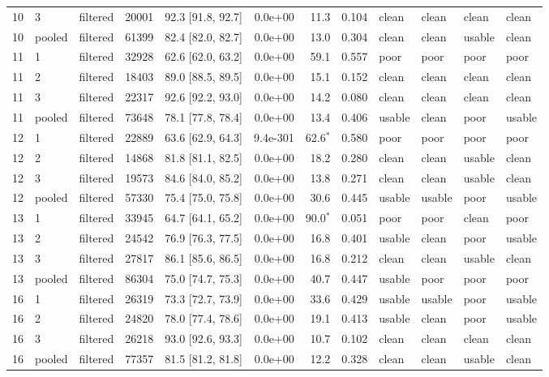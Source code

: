 \begin{longtable}{lllrrrrrllll}
10 & 3 & filtered & 20001 & 92.3 [91.8, 92.7] & 0.0e+00 & 11.3 & 0.104 & clean & clean & clean & clean \\
10 & pooled & filtered & 61399 & 82.4 [82.0, 82.7] & 0.0e+00 & 13.0 & 0.304 & clean & clean & usable & clean \\
11 & 1 & filtered & 32928 & 62.6 [62.0, 63.2] & 0.0e+00 & 59.1 & 0.557 & poor & poor & poor & poor \\
11 & 2 & filtered & 18403 & 89.0 [88.5, 89.5] & 0.0e+00 & 15.1 & 0.152 & clean & clean & clean & clean \\
11 & 3 & filtered & 22317 & 92.6 [92.2, 93.0] & 0.0e+00 & 14.2 & 0.080 & clean & clean & clean & clean \\
11 & pooled & filtered & 73648 & 78.1 [77.8, 78.4] & 0.0e+00 & 13.4 & 0.406 & usable & clean & poor & usable \\
12 & 1 & filtered & 22889 & 63.6 [62.9, 64.3] & 9.4e-301 & 62.6$^\ast$ & 0.580 & poor & poor & poor & poor \\
12 & 2 & filtered & 14868 & 81.8 [81.1, 82.5] & 0.0e+00 & 18.2 & 0.280 & clean & clean & usable & clean \\
12 & 3 & filtered & 19573 & 84.6 [84.0, 85.2] & 0.0e+00 & 13.8 & 0.271 & clean & clean & usable & clean \\
12 & pooled & filtered & 57330 & 75.4 [75.0, 75.8] & 0.0e+00 & 30.6 & 0.445 & usable & usable & poor & usable \\
13 & 1 & filtered & 33945 & 64.7 [64.1, 65.2] & 0.0e+00 & 90.0$^\ast$ & 0.051 & poor & poor & clean & poor \\
13 & 2 & filtered & 24542 & 76.9 [76.3, 77.5] & 0.0e+00 & 16.8 & 0.401 & usable & clean & poor & usable \\
13 & 3 & filtered & 27817 & 86.1 [85.6, 86.5] & 0.0e+00 & 16.8 & 0.212 & clean & clean & usable & clean \\
13 & pooled & filtered & 86304 & 75.0 [74.7, 75.3] & 0.0e+00 & 40.7 & 0.447 & usable & poor & poor & poor \\
16 & 1 & filtered & 26319 & 73.3 [72.7, 73.9] & 0.0e+00 & 33.6 & 0.429 & usable & usable & poor & usable \\
16 & 2 & filtered & 24820 & 78.0 [77.4, 78.6] & 0.0e+00 & 19.1 & 0.413 & usable & clean & poor & usable \\
16 & 3 & filtered & 26218 & 93.0 [92.6, 93.3] & 0.0e+00 & 10.7 & 0.102 & clean & clean & clean & clean \\
16 & pooled & filtered & 77357 & 81.5 [81.2, 81.8] & 0.0e+00 & 12.2 & 0.328 & clean & clean & usable & clean \\
\end{longtable}
